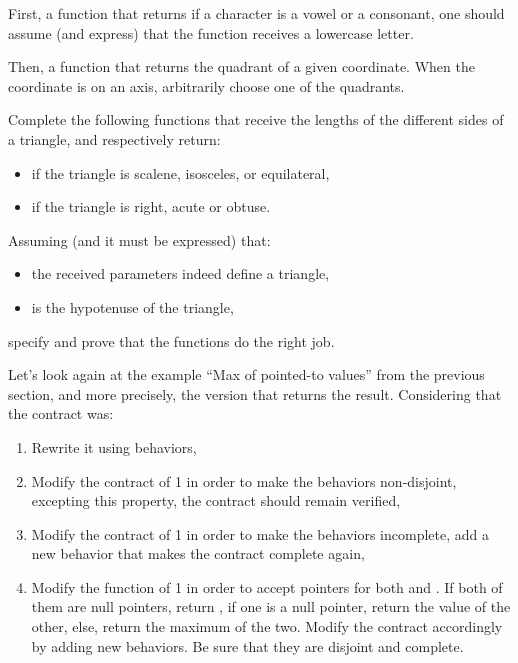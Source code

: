 First, a function that returns if a character is a vowel or a consonant,
one should assume (and express) that the function receives a lowercase
letter.




Then, a function that returns the quadrant of a given coordinate. When
the coordinate is on an axis, arbitrarily choose one of the quadrants.








Complete the following functions that receive the lengths of the different
sides of a triangle, and respectively return:
\begin{itemize}
\item if the triangle is scalene, isosceles, or equilateral,
\item if the triangle is right, acute or obtuse.
\end{itemize}




Assuming (and it must be expressed) that:


\begin{itemize}
\item the received parameters indeed define a triangle,
\item {} is the hypotenuse of the triangle,
\end{itemize}


specify and prove that the functions do the right job.






Let's look again at the example ``Max of pointed-to values'' from the previous section,
and more precisely, the version that returns the result. Considering that
the contract was:






\begin{enumerate}
\item Rewrite it using behaviors,
\item Modify the contract of 1 in order to make the behaviors non-disjoint,
  excepting this property, the contract should remain verified,
\item Modify the contract of 1 in order to make the behaviors incomplete,
  add a new behavior that makes the contract complete again,
\item Modify the function of 1 in order to accept  pointers
  for both  and . If both of them are null pointers,
  return , if one is a null pointer, return the value of
  the other, else, return the maximum of the two. Modify the contract accordingly
  by adding new behaviors. Be sure that they are disjoint and complete.
\end{enumerate}


